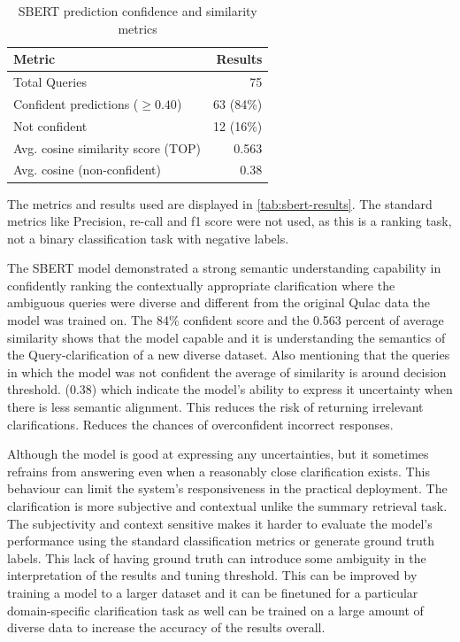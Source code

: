 \documentclass[11pt]{article}
\begin{document}
\begin{table}[h]
  \centering
  \begin{tabular}{l r}
  \textbf{Metric} & \textbf{Results} \\
  \hline
  Total Queries & 75 \\
  Confident predictions ($\geq 0.40$) & 63 (84\%) \\
  Not confident & 12 (16\%) \\
  Avg. cosine similarity score (TOP) & 0.563 \\
  Avg. cosine (non-confident) & 0.38 \\
  \hline
  \end{tabular}
  \caption{SBERT prediction confidence and similarity metrics}
  \label{tab:sbert-results}
\end{table}
  
The metrics and results used are displayed in \autoref{tab:sbert-results}. The standard metrics like Precision, re-call and f1 score were not used, as this is a ranking task, not a binary classification task with negative labels.

The SBERT model demonstrated a strong semantic understanding capability in confidently ranking the contextually appropriate clarification where the ambiguous queries were diverse and different from the original Qulac data the model was trained on. The 84\% confident score and the 0.563 percent of average similarity shows that the model capable and it is understanding the semantics of the Query-clarification of a new diverse dataset. Also mentioning that the queries in which the model was not confident the average of similarity is around decision threshold. (0.38) which indicate the model's ability to express it uncertainty when there is less semantic alignment. This reduces the risk of returning irrelevant clarifications.  Reduces the chances of overconfident incorrect responses.

Although the model is good at expressing any uncertainties, but it sometimes refrains from answering even when a reasonably close clarification exists.  This behaviour can limit the system's responsiveness in the practical deployment.
The clarification is more subjective and contextual unlike the summary retrieval task. The subjectivity and context sensitive makes it harder to evaluate the model's performance using the standard classification metrics or generate ground truth labels. This lack of having ground truth can introduce some ambiguity in the interpretation of the results and tuning threshold.  This can be improved by training a model to a larger dataset and it can be finetuned for a particular domain-specific clarification task as well can be trained on a large amount of diverse data to increase the accuracy of the results overall.
\end{document}
